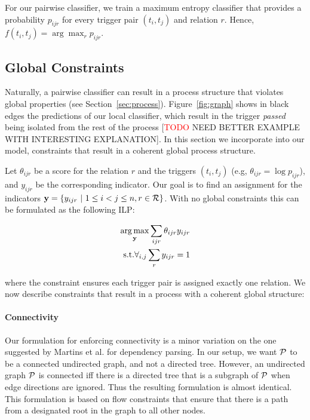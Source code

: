 For our pairwise classifier, we train a maximum entropy classifier that provides a probability $p_{ijr}$ for every trigger pair $(t_i,t_j)$ and relation $r$. Hence, $f(t_i,t_j)= \arg\max_r p_{ijr}$.

\subsection{Global Constraints} \label{subsec:global}

Naturally, a pairwise classifier can result in a process structure that violates global properties (see Section~\ref{sec:process}). Figure~\ref{fig:graph} shows in black edges the predictions of our local classifier, which result in the trigger \emph{passed} being isolated from the rest of the process [\textcolor{red}{TODO} NEED BETTER EXAMPLE WITH INTERESTING EXPLANATION]. In this section we incorporate into our model, constraints that result in a coherent global process structure.

Let $\theta_{ijr}$ be a score for the relation $r$ and the triggers $(t_i,t_j)$ (e.g, $\theta_{ijr}=\log p_{ijr}$), and $y_{ijr}$ be the corresponding indicator. Our goal is to find an assignment for the indicators $\mathbf{y}=\{y_{ijr} \ | \ 1 \leq i < j \leq n, r \in \mathcal{R} \}$. With no global constraints this can be formulated as the following ILP:

\begin{align}
\operatorname*{arg\,max}_{\mathbf{y}} \sum_{ijr} \theta_{ijr} y_{ijr} \\
\mbox{s.t.} \forall_{i,j} \sum_r y_{ijr}=1 \nonumber
\end{align}

\noindent where the constraint ensures each trigger pair is assigned exactly one relation. We now describe constraints that result in a process with a coherent global structure:

\paragraph{Connectivity} 
Our formulation for enforcing connectivity is a minor variation on the one suggested by Martins et al.  for dependency parsing. In our setup, we want $\mathcal{P}$ to be a connected undirected graph, and not a directed tree. However, an undirected graph $\mathcal{P}$ is connected iff there is a directed tree that is a subgraph of $\mathcal{P}$ when edge directions are ignored. Thus the resulting formulation is almost identical. This formulation is based on flow constraints that ensure that there is a path from a designated root in the graph to all other nodes.

